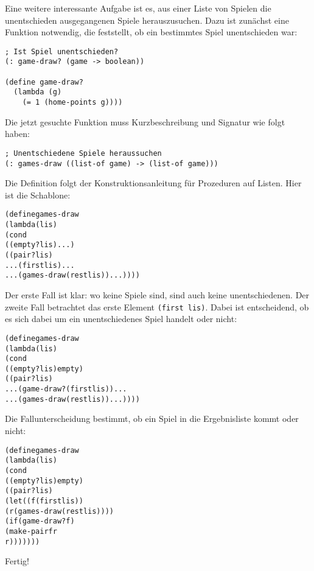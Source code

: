 Eine weitere interessante Aufgabe ist es, aus einer Liste von Spielen die
unentschieden ausgegangenen Spiele herauszusuchen. Dazu ist zunächst eine
Funktion notwendig, die feststellt, ob ein bestimmtes Spiel unentschieden war:
\begin{verbatim}
; Ist Spiel unentschieden?
(: game-draw? (game -> boolean))

(define game-draw?
  (lambda (g)
    (= 1 (home-points g))))
\end{verbatim}
Die jetzt gesuchte Funktion muss Kurzbeschreibung und Signatur wie folgt haben:
\begin{verbatim}
; Unentschiedene Spiele heraussuchen
(: games-draw ((list-of game) -> (list-of game)))
\end{verbatim}
%
Die Definition folgt der Konstruktionsanleitung für Prozeduren auf Listen.
Hier ist die Schablone:
%
\begin{alltt}
(define games-draw
  (lambda (lis)
    (cond
      ((empty? lis) ...)
      ((pair? lis)
       ... (first lis) ...
       ... (games-draw (rest lis)) ...))))
\end{alltt}
%
Der erste Fall ist klar: wo keine Spiele sind, sind auch keine
unentschiedenen.  Der zweite Fall betrachtet das erste Element \texttt{(first
  lis)}.  Dabei ist entscheidend, ob es sich dabei um ein unentschiedenes Spiel
handelt oder nicht:
%
\begin{alltt}
(define games-draw
  (lambda (lis)
    (cond
      ((empty? lis) empty)
      ((pair? lis)
       ... (game-draw? (first lis)) ...
       ... (games-draw (rest lis)) ...))))
\end{alltt}
%
Die Fallunterscheidung bestimmt, ob ein Spiel in die Ergebnisliste kommt oder
nicht:
%
\begin{alltt}
(define games-draw
  (lambda (lis)
    (cond
      ((empty? lis) empty)
      ((pair? lis)
       (let ((f (first lis))
             (r (games-draw (rest lis))))
       (if (game-draw? f)
           (make-pair f r
           r)))))))
\end{alltt}
%
Fertig!

